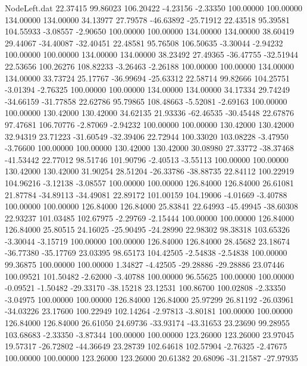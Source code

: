 \begin{filecontents}{NodeLeft.dat}
  22.37415   99.86023  106.20422    -4.23156   -2.33350  100.00000  100.00000  134.00000  134.00000   34.13977   27.79578  -46.63892  -25.71912
  22.43518   95.39581  104.55933    -3.08557   -2.90650  100.00000  100.00000  134.00000  134.00000   38.60419   29.44067  -34.40087  -32.40451
  22.48581   95.76508  106.50635    -3.30044   -2.94232  100.00000  100.00000  134.00000  134.00000   38.23492   27.49365  -36.47755  -32.51944
  22.53656  100.26276  108.82233    -3.26463   -2.26188  100.00000  100.00000  134.00000  134.00000   33.73724   25.17767  -36.99694  -25.63312
  22.58714   99.82666  104.25751    -3.01394   -2.76325  100.00000  100.00000  134.00000  134.00000   34.17334   29.74249  -34.66159  -31.77858
  22.62786   95.79865  108.48663    -5.52081   -2.69163  100.00000  100.00000  130.42000  130.42000   34.62135   21.93336  -62.46535  -30.45448
  22.67876   97.47681  106.70776    -2.87069   -2.94232  100.00000  100.00000  130.42000  130.42000   32.94319   23.71223  -31.60549  -32.39406
  22.72944  100.33020  103.08228    -3.47950   -3.76600  100.00000  100.00000  130.42000  130.42000   30.08980   27.33772  -38.37468  -41.53442
  22.77012   98.51746  101.90796    -2.40513   -3.55113  100.00000  100.00000  130.42000  130.42000   31.90254   28.51204  -26.33786  -38.88735
  22.84112  100.22919  104.96216    -3.12138   -3.08557  100.00000  100.00000  126.84000  126.84000   26.61081   21.87784  -34.89113  -34.49081
  22.89172  101.00159  104.19006    -4.01669   -3.40788  100.00000  100.00000  126.84000  126.84000   25.83841   22.64993  -45.49945  -38.60308
  22.93237  101.03485  102.67975    -2.29769   -2.15444  100.00000  100.00000  126.84000  126.84000   25.80515   24.16025  -25.90495  -24.28990
  22.98302   98.38318  103.65326    -3.30044   -3.15719  100.00000  100.00000  126.84000  126.84000   28.45682   23.18674  -36.77380  -35.17769
  23.03395   98.65173  104.42505    -2.54838   -2.54838  100.00000   99.36875  100.00000  100.00000    1.34827   -4.42505  -29.28886  -29.28886
  23.07446  100.09521  101.50482    -2.62000   -3.40788  100.00000   96.55625  100.00000  100.00000   -0.09521   -1.50482  -29.33170  -38.15218
  23.12531  100.86700  100.02808    -2.33350   -3.04975  100.00000  100.00000  126.84000  126.84000   25.97299   26.81192  -26.03961  -34.03226
  23.17600  100.22949  102.14264    -2.97813   -3.80181  100.00000  100.00000  126.84000  126.84000   26.61050   24.69736  -33.93174  -43.31653
  23.23690   99.28955  103.68683    -2.33350   -3.87344  100.00000  100.00000  123.26000  123.26000   23.97045   19.57317  -26.72802  -44.36649
  23.28739  102.64618  102.57904    -2.76325   -2.47675  100.00000  100.00000  123.26000  123.26000   20.61382   20.68096  -31.21587  -27.97935

\end{filecontents}
